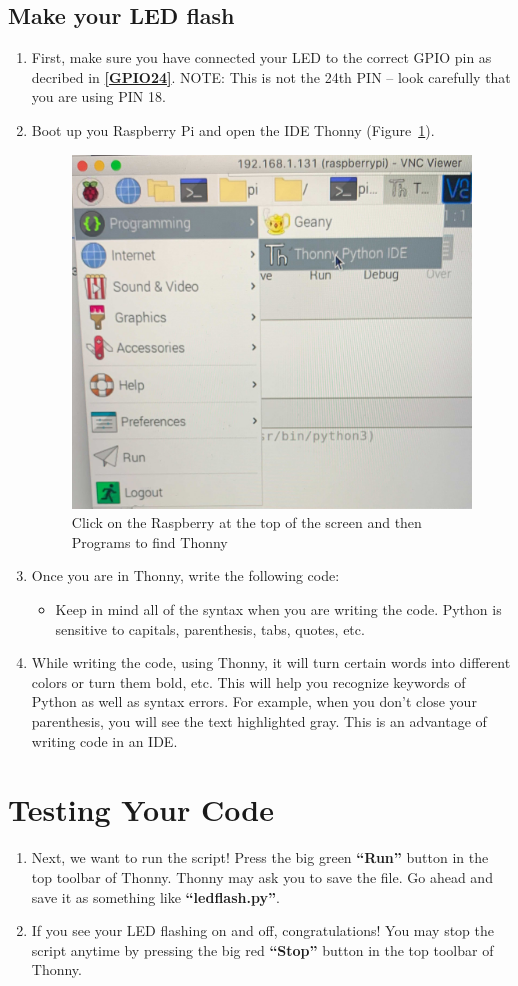 \documentclass{article}\usepackage[]{graphicx}\usepackage[]{color}
\begin{document}
\subsection{Make your LED flash}

\begin{enumerate}
\item First, make sure you have connected your LED to the correct GPIO pin as decribed in \textbf{\ref{GPIO24}}. NOTE: This is not the 24th PIN -- look carefully that you are using PIN 18.
\item Boot up you Raspberry Pi and open the IDE Thonny (Figure~\ref{fig:thonny}).

\begin{figure}
\includegraphics[width=.50\textwidth]{images/15_Pi_Thonny}
\caption{Click on the Raspberry at the top of the screen and then Programs to find Thonny}
\label{fig:thonny}
\end{figure}

\item Once you are in Thonny, write the following code: \newline

\begin{itemize}
\item Keep in mind all of the syntax when you are writing the code. Python is sensitive to capitals, parenthesis, tabs, quotes, etc.
\end{itemize}
\item While writing the code, using Thonny, it will turn certain words into different colors or turn them bold, etc. This will help you recognize keywords of Python as well as syntax errors. For example, when you don't close your parenthesis, you will see the text highlighted gray. This is an advantage of writing code in an IDE.
\end{enumerate}

\section{Testing Your Code}
\begin{enumerate}
\item Next, we want to run the script! Press the big green \textbf{``Run''} button in the top toolbar of Thonny. Thonny may ask you to save the file. Go ahead and save it as something like \textbf{``ledflash.py''}.
\item If you see your LED flashing on and off, congratulations! You may stop the script anytime by pressing the big red \textbf{``Stop''} button in the top toolbar of Thonny.
\end{enumerate}
\end{document}
